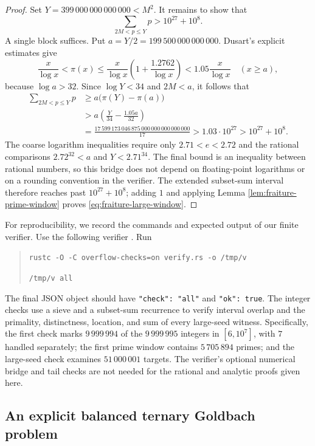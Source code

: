 \documentclass[11pt,letterpaper,reqno]{amsart}
\numberwithin{equation}{section}
\theoremstyle{remark}
\newcommand{\1}{\mathbf 1}
\renewcommand{\leq}{\leqslant}
\renewcommand{\geq}{\geqslant}
\begin{document}
\begin{proof}
Set $Y=399\,000\,000\,000\,000<M^2$. It remains to show that
\[
 \sum_{2M<p\leq Y}p>10^{27}+10^8.
\]
A single block suffices. Put $a=Y/2=199\,500\,000\,000\,000$.
Dusart's explicit estimates \cite[Theorem~6.9]{Dusart2010} give
\[
 \frac{x}{\log x}<\pi(x)
 \leq\frac{x}{\log x}\left(1+\frac{1.2762}{\log x}\right)
 <1.05\frac{x}{\log x}
 \quad(x\geq a),
\]
because $\log a>32$. Since $\log Y<34$ and $2M<a$, it follows that
\begin{align*}
 \sum_{2M<p\leq Y}p
 &\geq a\bigl(\pi(Y)-\pi(a)\bigr)\\
 &>a\left(\frac{Y}{34}-\frac{1.05a}{32}\right)\\
 &=\frac{17\,599\,173\,046\,875\,000\,000\,000\,000\,000}{17}
 >1.03\cdot10^{27}>10^{27}+10^8.
\end{align*}
The coarse logarithm inequalities require only
$2.71<e<2.72$ and the rational comparisons
$2.72^{32}<a$ and $Y<2.71^{34}$.
The final bound is an inequality between rational numbers, so this bridge
does not depend on floating-point logarithms or on a rounding convention
in the verifier.
The extended subset-sum interval therefore reaches past $10^{27}+10^8$;
adding $1$ and applying Lemma \ref{lem:fraiture-prime-window} proves
\eqref{eq:fraiture-large-window}.
\end{proof}

For reproducibility, we record the commands and expected output of our finite verifier.
Use the following verifier \cite{FraitureVerifier}.
Run
\begin{quote}
\texttt{rustc -O -C overflow-checks=on verify.rs -o /tmp/v}\par
\texttt{/tmp/v all}
\end{quote}
The final JSON object should have \texttt{"check": "all"} and
\texttt{"ok": true}. The integer checks use a sieve and a subset-sum recurrence to verify
interval overlap and the primality, distinctness, location, and sum of
every large-seed witness. Specifically, the first
check marks $9\,999\,994$ of the $9\,999\,995$ integers in
$[6,10^7]$, with $7$ handled separately; the first prime window contains
$5\,705\,894$ primes; and the large-seed check examines
$51\,000\,001$ targets. The verifier's optional numerical bridge and
tail checks are not needed for the rational and analytic proofs given here.

\subsection{An explicit balanced ternary Goldbach problem}
\end{document}
